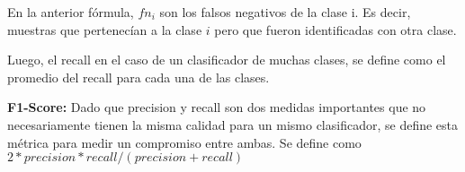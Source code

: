 En la anterior f\'ormula, $fn_{i}$ son los falsos negativos de la clase i. Es decir, muestras que pertenec\'ian a la clase $i$ pero que fueron identificadas con otra clase.

Luego, el recall en el caso de un clasificador de muchas clases, se define como el promedio del recall para cada una de las clases.

\textbf{F1-Score:} Dado que precision y recall son dos medidas importantes que no necesariamente tienen la misma calidad para un mismo clasificador, se define esta m\'etrica para medir un compromiso entre ambas. Se define como $2 * precision * recall / (precision + recall)$